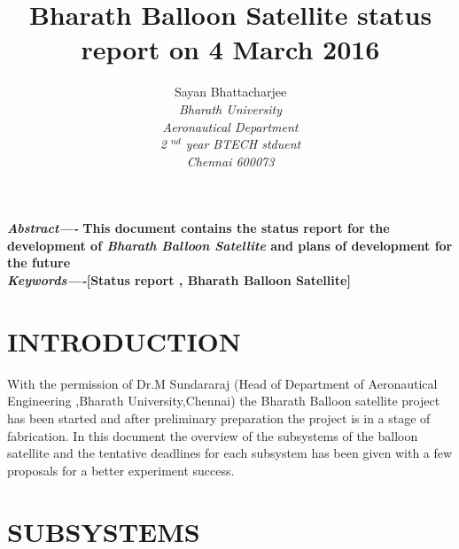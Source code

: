 \documentclass[9pt]{IEEEtran}
\begin{document}
\title{\textbf{Bharath Balloon Satellite status report on 4 March 2016}}



\author{Sayan Bhattacharjee \\
				\emph{Bharath University} \\
				\emph{Aeronautical Department} \\
				\emph{2 $^{ nd}$ year BTECH stduent} \\
				\emph{Chennai 600073}}
\maketitle{}

\emph{\textbf{Abstract----}}\textbf{ This document contains the status report for the development of \emph{Bharath Balloon Satellite}
																		 	and plans of development for the future
													 }\\
\textbf{\emph{Keywords----}}\textbf{[Status report , Bharath Balloon Satellite]}
\\
\section{INTRODUCTION}
With the permission of Dr.M Sundararaj (Head of Department of Aeronautical Engineering ,Bharath University,Chennai) the Bharath Balloon satellite
project has been started and after preliminary preparation the project is in a stage of fabrication. In this document the overview of the subsystems of the
balloon satellite and the tentative deadlines for each subsystem has been given with a few proposals for a better experiment success.

\section{SUBSYSTEMS}
\end{document}
